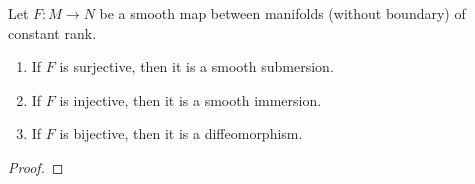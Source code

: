 \begin{theorem}
    Let $F: M\to N$ be a smooth map between manifolds (without boundary) of constant rank.
    \begin{enumerate}[label=(\alph*)]
        \item If $F$ is surjective, then it is a smooth submersion.
        \item If $F$ is injective, then it is a smooth immersion.
        \item If $F$ is bijective, then it is a diffeomorphism.
    \end{enumerate}
\end{theorem}
\begin{proof}
\end{proof}